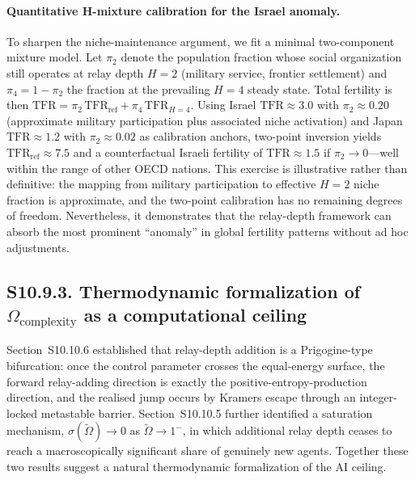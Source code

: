 \documentclass[11pt]{article}
\begin{document}
\paragraph{Quantitative H-mixture calibration for the Israel anomaly.}
To sharpen the niche-maintenance argument, we fit a minimal two-component
mixture model.  Let $\pi_2$ denote the population fraction whose
social organization still operates at relay depth $H=2$ (military
service, frontier settlement) and $\pi_4 = 1-\pi_2$ the fraction at
the prevailing $H=4$ steady state.  Total fertility is then
$\mathrm{TFR} = \pi_2\,\mathrm{TFR}_{\mathrm{ref}} + \pi_4\,\mathrm{TFR}_{H=4}$.
Using Israel $\mathrm{TFR}\approx 3.0$ with $\pi_2\approx 0.20$
(approximate military participation plus associated niche activation) and
Japan $\mathrm{TFR}\approx 1.2$ with $\pi_2\approx 0.02$ as calibration
anchors, two-point inversion yields $\mathrm{TFR}_{\mathrm{ref}}\approx
7.5$ and a counterfactual Israeli fertility of $\mathrm{TFR}\approx 1.5$
if $\pi_2\to 0$---well within the range of other OECD nations.
This exercise is illustrative rather than definitive: the mapping from
military participation to effective $H=2$ niche fraction is
approximate, and the two-point calibration has no remaining
degrees of freedom.  Nevertheless, it demonstrates that the
relay-depth framework can absorb the most prominent ``anomaly'' in
global fertility patterns without ad hoc adjustments.

\subsection*{S10.9.3. Thermodynamic formalization of $\Omega_{\mathrm{complexity}}$ as a computational ceiling}
\label{subsec:S10_9_3_omega_complexity}


Section~S10.10.6 established that relay-depth addition is a Prigogine-type
bifurcation: once the control parameter crosses the equal-energy surface,
the forward relay-adding direction is exactly the positive-entropy-production
direction, and the realised jump occurs by Kramers escape through an
integer-locked metastable barrier.
Section~S10.10.5 further identified a saturation mechanism,
$\sigma(\tilde\Omega)\to 0$ as $\tilde\Omega\to 1^-$, in which additional
relay depth ceases to reach a macroscopically significant share of genuinely
new agents.
Together these two results suggest a natural thermodynamic formalization of
the AI ceiling.
\end{document}
